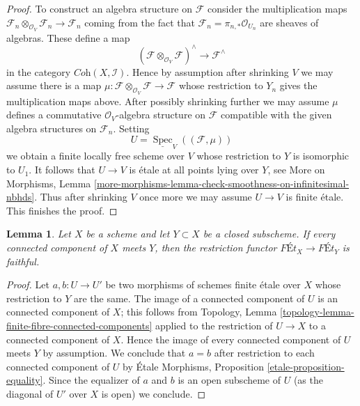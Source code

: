 \documentclass{stacks-project}
\theoremstyle{plain}
\newtheorem{lemma}[subsection]{Lemma}
\theoremstyle{definition}
\theoremstyle{remark}
\numberwithin{equation}{subsection}
\def\Spec{\mathop{\mathrm{Spec}}}
\begin{document}
\begin{proof}
\medskip\noindent
To construct an algebra structure on $\mathcal{F}$ consider the multiplication
maps
$\mathcal{F}_n \otimes_{\mathcal{O}_V} \mathcal{F}_n \to \mathcal{F}_n$
coming from the fact that $\mathcal{F}_n = \pi_{n, *}\mathcal{O}_{U_n}$
are sheaves of algebras. These define a map
$$
(\mathcal{F}\otimes_{\mathcal{O}_V} \mathcal{F})^\wedge
\longrightarrow
\mathcal{F}^\wedge
$$
in the category $\textit{Coh}(X, \mathcal{I})$. Hence by assumption
after shrinking $V$ we may assume there is a map
$\mu : \mathcal{F}\otimes_{\mathcal{O}_V} \mathcal{F} \to \mathcal{F}$
whose restriction to $Y_n$ gives the multiplication maps above.
After possibly shrinking further we may assume $\mu$
defines a commutative $\mathcal{O}_V$-algebra
structure on $\mathcal{F}$ compatible with the given algebra
structures on $\mathcal{F}_n$.
Setting
$$
U = \underline{\Spec}_V((\mathcal{F}, \mu))
$$
we obtain a finite locally free scheme over $V$ whose restriction
to $Y$ is isomorphic to $U_1$. It follows that $U \to V$
is \'etale at all points lying over $Y$, see
More on Morphisms, Lemma
\ref{more-morphisms-lemma-check-smoothness-on-infinitesimal-nbhds}.
Thus after shrinking $V$ once more we may assume $U \to V$ is
finite \'etale. This finishes the proof.
\end{proof}

\begin{lemma}
\label{lemma-restriction-faithful}
Let $X$ be a scheme and let $Y \subset X$ be a closed subscheme.
If every connected component of $X$ meets $Y$, then
the restriction functor $\textit{F\'Et}_X \to \textit{F\'Et}_Y$
is faithful.
\end{lemma}

\begin{proof}
Let $a, b : U \to U'$ be two morphisms of schemes finite \'etale over $X$
whose restriction to $Y$ are the same. The image of a connected component
of $U$ is an connected component of $X$; this follows from
Topology, Lemma \ref{topology-lemma-finite-fibre-connected-components}
applied to the restriction of $U \to X$ to a connected component of $X$.
Hence the image of every connected component of $U$ meets $Y$
by assumption. We conclude that $a = b$ after restriction to each
connected component of $U$ by \'Etale Morphisms, Proposition
\ref{etale-proposition-equality}. Since the equalizer of $a$ and $b$
is an open subscheme of $U$ (as the diagonal of $U'$ over $X$ is open)
we conclude.
\end{proof}
\end{document}
